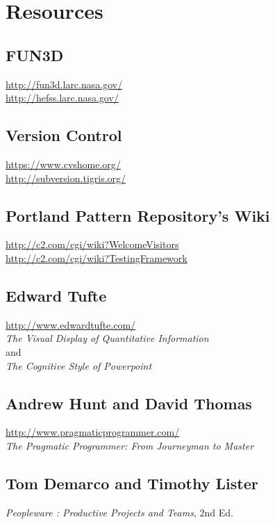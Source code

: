 \documentclass[twocolumn]{article}
\begin{document}
  \section{Resources}

  \subsection{FUN3D}
  \url{http://fun3d.larc.nasa.gov/} \\
  \url{http://hefss.larc.nasa.gov/}

  \subsection{Version Control}
  \url{https://www.cvshome.org/}\\
  \url{http://subversion.tigris.org/}

  \subsection{Portland Pattern Repository's Wiki}
  \url{http://c2.com/cgi/wiki?WelcomeVisitors} \\
  \url{http://c2.com/cgi/wiki?TestingFramework}

  \subsection{Edward Tufte}
  \url{http://www.edwardtufte.com/}\\
  \textit{The Visual Display of Quantitative Information} \\
  and \\
  \textit{The Cognitive Style of Powerpoint}

  \subsection{Andrew Hunt and David Thomas} 
  \url{http://www.pragmaticprogrammer.com/}\\
  \textit{The Pragmatic Programmer: From Journeyman to Master}

  \subsection{ Tom Demarco and Timothy Lister } 
  \textit{Peopleware : Productive Projects and Teams}, 2nd Ed.
\end{document}
